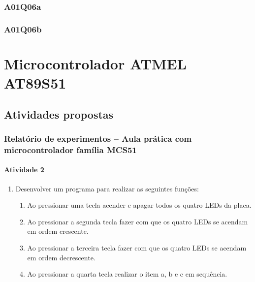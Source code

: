 \documentclass[
	12pt,				%
	openright,			%
  oneside,     %
	a4paper,			%
	english,			%
	french,				%
	spanish,			%
	brazil				%
	]{abntex2}
\begin{document}
\subsection*{A01Q06a}


\subsection*{A01Q06b}




















%
%

\chapter{Microcontrolador ATMEL AT89S51}%
\label{cha:2-ATMEL-AT89S51}

\section{Atividades propostas} %
\label{sec:atividades_propostas-AT89S51}

\subsection*{Relatório de experimentos – Aula prática com microcontrolador família MCS51}

\subsubsection*{Atividade 2}

\begin{enumerate}
\item Desenvolver um programa para realizar as seguintes funções:
\begin{enumerate}
\item Ao pressionar uma tecla acender e apagar todos os quatro LEDs da placa.
\item Ao pressionar a segunda tecla fazer com que os quatro LEDs se acendam em ordem crescente.
\item Ao pressionar a terceira tecla fazer com que os quatro LEDs se acendam em ordem decrescente.
\item Ao pressionar a quarta tecla realizar o item a, b e c em sequência.
\end{enumerate}
\end{enumerate}
\end{document}
